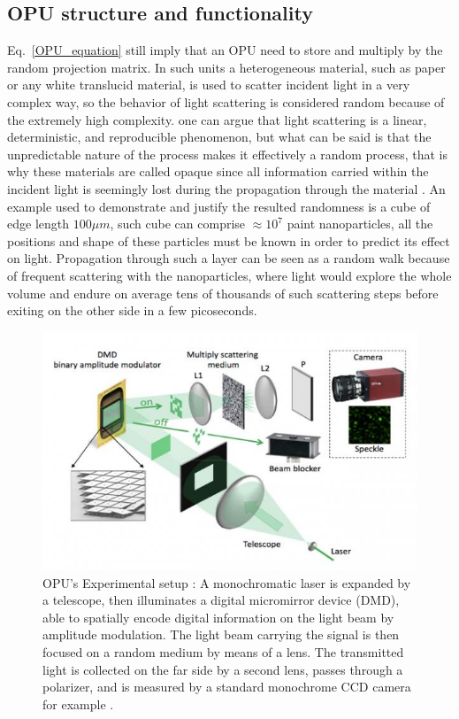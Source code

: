 \subsection{OPU structure and functionality}
Eq.~\ref{OPU_equation} still imply that an OPU need to store and multiply by the random projection matrix.\newline
In such units a heterogeneous material, such as paper or any white translucid material, is used to scatter incident light in a very complex way, so the behavior of light scattering is considered random because of the extremely high complexity. one can argue that light scattering is a linear, deterministic, and reproducible phenomenon, but what can be said is that the unpredictable nature of the process makes it effectively a random process, that is why these materials are called opaque since all information carried within the incident light is seemingly lost during the propagation through the material \citep{saade_opu}. An example used to demonstrate and justify the resulted randomness is a cube of edge length $100\mu m$, such cube can comprise $\approx 10^7$ paint nanoparticles, all the positions and shape of these particles must be known in order to predict its effect on light. Propagation through such a layer can be seen as a random walk because of frequent scattering with the nanoparticles, where light would explore the whole volume
and endure on average tens of thousands of such scattering steps before exiting on the other side in a few picoseconds.\newline

\begin{figure}[ht!]
\begin{center}
\includegraphics[scale=0.5]{figs/lighton630.jpg}
\end{center}
\caption[OPU's Experimental setup]{OPU's Experimental setup \citep{saade_opu}: A monochromatic laser is expanded by a telescope, then
illuminates a digital micromirror device (DMD), able to spatially encode digital information on the light beam by
amplitude modulation. The light beam carrying the signal is then focused on a random
medium by means of a lens. The transmitted light is collected on the
far side by a second lens, passes through a polarizer, and is measured by a standard monochrome CCD camera for example .}


\label{fig_opu}
\end{figure}


